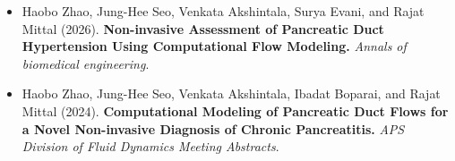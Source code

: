 
\begin{itemize}[leftmargin=*, itemsep=0pt]
    \item Haobo Zhao, Jung-Hee Seo, Venkata Akshintala, Surya Evani, and Rajat Mittal (2026). \textbf{Non-invasive Assessment of Pancreatic Duct Hypertension Using Computational Flow Modeling.} \textit{Annals of biomedical engineering}.
    \item Haobo Zhao, Jung-Hee Seo, Venkata Akshintala, Ibadat Boparai, and Rajat Mittal (2024). \textbf{Computational Modeling of Pancreatic Duct Flows for a Novel Non-invasive Diagnosis of Chronic Pancreatitis.} \textit{APS Division of Fluid Dynamics Meeting Abstracts}.
\end{itemize}
